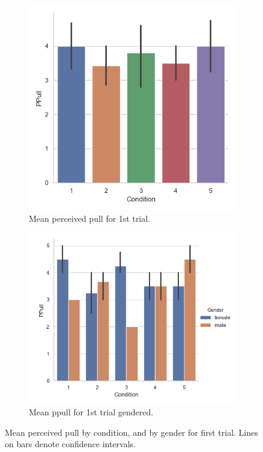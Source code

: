 \begin{figure}[H]
 \begin{subfigure}[b]{0.5\textwidth}
     \centering
     \includegraphics[scale=0.5]{Files/Plots/ppull_first_trial.png}
     \caption{Mean perceived pull for 1st trial.}
     \label{fig:meanPPull1st}
 \end{subfigure}
  \begin{subfigure}[b]{0.5\textwidth}
     \centering
     \includegraphics[scale=0.5]{Files/Plots/ppull_first_trial_gen.png}
     \caption{Mean ppull for 1st trial gendered.}
     \label{fig:meanPPullGen1st}
 \end{subfigure}
     \caption{Mean perceived pull by condition, and by gender for first trial. Lines on bars denote confidence intervals.}
    \label{fig:PPull1st}
\end{figure}


